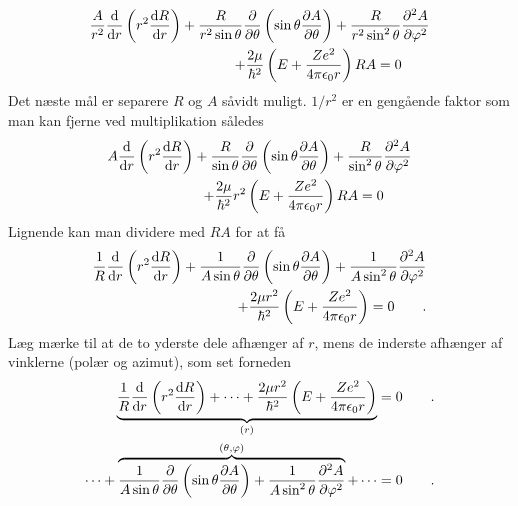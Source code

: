 \documentclass[12pt]{article}
\theoremstyle{definition}
\theoremstyle{remark}
\theoremstyle{definition}
\numberwithin{equation}{section}
\begin{document}
\begin{align}
\begin{split}
    \frac{A}{r^2}\frac{\rm d}{{\rm d}r}\left(r^2\frac{{\rm d}R}{{\rm d}r}\right)+\frac{R}{r^2\sin\theta}\frac{\partial}{\partial\theta}\left(\sin\theta\frac{\partial A}{\partial\theta}\right)+\frac{R}{r^2\sin^2\theta}\frac{\partial^2A}{\partial\varphi^2}
    \\+\frac{2\mu}{\hbar^2}\left(E+\frac{Ze^2}{4\pi\epsilon_0r}\right)RA=0\qquad
\end{split}
\end{align}
Det næste mål er separere $R$ og $A$ såvidt muligt. $1/r^2$ er en gengående faktor som man kan fjerne ved multiplikation således
\begin{align}
\begin{split}
    A\frac{\rm d}{{\rm d}r}\left(r^2\frac{{\rm d}R}{{\rm d}r}\right)
    +\frac{R}{\sin\theta}\frac{\partial}{\partial\theta}\left(\sin\theta\frac{\partial A}{\partial\theta}\right)
    +\frac{R}{\sin^2\theta}\frac{\partial^2A}{\partial\varphi^2}
    \\
    +\frac{2\mu}{\hbar^2}r^2\left(E+\frac{Ze^2}{4\pi\epsilon_0r}\right)RA=0\qquad
\end{split}
\end{align}
Lignende kan man dividere med $RA$ for at få
\begin{align}
    \begin{split}
        \frac{1}{R}\frac{\rm d}{{\rm d}r}\left(r^2\frac{{\rm d}R}{{\rm d}r}\right)
        +\frac{1}{A\sin\theta}\frac{\partial}{\partial\theta}\left(\sin\theta\frac{\partial A}{\partial\theta}\right)
        +\frac{1}{A\sin^2\theta}\frac{\partial^2A}{\partial\varphi^2}
        \\
        +\frac{2\mu r^2}{\hbar^2}\left(E+\frac{Ze^2}{4\pi\epsilon_0r}\right)
        =0\qquad.
    \end{split}
\end{align}
Læg mærke til at de to yderste dele afhænger af $r$, mens de inderste afhænger af vinklerne (polær og azimut), som set forneden
\begin{align}
    \begin{split}
        \underbrace{\frac{1}{R}\frac{\rm d}{{\rm d}r}\left(r^2\frac{{\rm d}R}{{\rm d}r}\right)
        +\dots+\frac{2\mu r^2}{\hbar^2}\left(E+\frac{Ze^2}{4\pi\epsilon_0r}\right)}_{(r)}
        =0\qquad.
        \\
        \dots
        +\overbrace{\frac{1}{A\sin\theta}\frac{\partial}{\partial\theta}\left(\sin\theta\frac{\partial A}{\partial\theta}\right)
        +\frac{1}{A\sin^2\theta}\frac{\partial^2A}{\partial\varphi^2}}^{(\theta, \varphi)}+\dots
        =0\qquad.
    \end{split}
\end{align}
\end{document}
